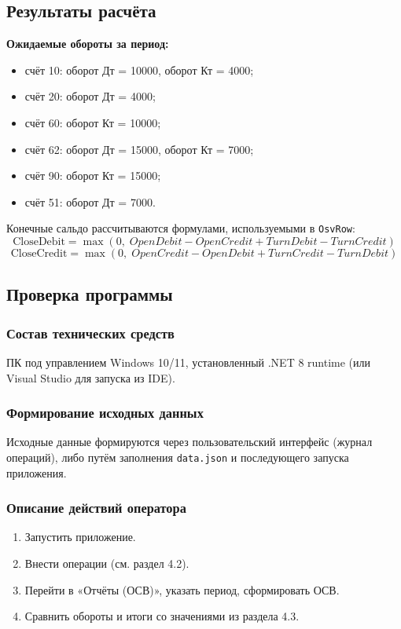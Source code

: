 \documentclass[14pt,a4paper]{extarticle}
\begin{document}
\subsection{Результаты расчёта}
\textbf{Ожидаемые обороты за период:}
\begin{itemize}
    \item счёт 10: оборот Дт = 10000, оборот Кт = 4000;
    \item счёт 20: оборот Дт = 4000;
    \item счёт 60: оборот Кт = 10000;
    \item счёт 62: оборот Дт = 15000, оборот Кт = 7000;
    \item счёт 90: оборот Кт = 15000;
    \item счёт 51: оборот Дт = 7000.
\end{itemize}
Конечные сальдо рассчитываются формулами, используемыми в \texttt{OsvRow}:
\begin{equation}
\text{CloseDebit}=\max(0,\;OpenDebit-OpenCredit+TurnDebit-TurnCredit)
\end{equation}
\begin{equation}
\text{CloseCredit}=\max(0,\;OpenCredit-OpenDebit+TurnCredit-TurnDebit)
\end{equation}

\subsection{Проверка программы}
\subsubsection{Состав технических средств}
ПК под управлением Windows 10/11, установленный .NET 8 runtime (или Visual Studio для запуска из IDE).

\subsubsection{Формирование исходных данных}
Исходные данные формируются через пользовательский интерфейс (журнал операций), либо путём заполнения \texttt{data.json} и последующего запуска приложения.

\subsubsection{Описание действий оператора}
\begin{enumerate}
    \item Запустить приложение.
    \item Внести операции (см. раздел 4.2).
    \item Перейти в «Отчёты (ОСВ)», указать период, сформировать ОСВ.
    \item Сравнить обороты и итоги со значениями из раздела 4.3.
\end{enumerate}
\end{document}
